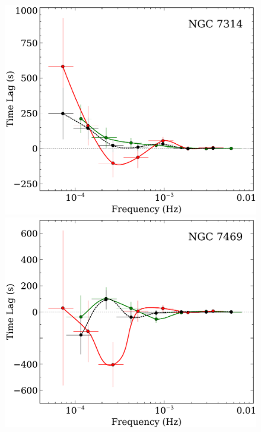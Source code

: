 \documentclass{article}
\begin{document}
\begin{figure}
    \ContinuedFloat
\centering
\includegraphics[scale=0.4]{images/NGC7314-lag-results-lo-hi-flux-FP.pdf}
\includegraphics[scale=0.4]{images/NGC7469-lag-results-lo-hi-flux-FP.pdf}\\
\vspace{0.5cm}

\end{figure}
\end{document}
